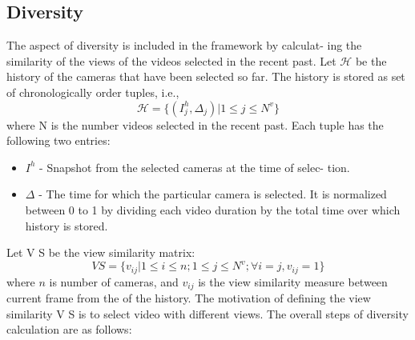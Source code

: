 \documentclass{sig-alternate-05-2015}
\begin{document}
\subsection{Diversity}
The aspect of diversity is included in the framework by calculat-
ing the similarity of the views of the videos selected in the recent
past. Let $\mathcal{H}$ be the history of the cameras that have been selected
so far. The history is stored as set of chronologically order tuples,
i.e.,
\begin{equation}
    \mathcal{H}=\{(I^h_j,\Delta_j)|1\leq j\leq N^v\}
\end{equation}
where N is the number videos selected in the recent past. Each
tuple has the following two entries:
\begin{itemize}
    \item $I^h$ - Snapshot from the selected cameras at the time of selec-
tion.
    \item $\Delta$ - The time for which the particular camera is selected. It
is normalized between 0 to 1 by dividing each video duration
by the total time over which history is stored.
\end{itemize}
Let V S be the view similarity matrix:
\begin{equation}
    VS = \{v_{ij}|1\leq i\leq n;1\leq j\leq N^v;\forall i=j,v_{ij}=1\}
\end{equation}
where $n$ is number of cameras, and $v_{ij}$ is the view similarity
measure between current frame from the %
of the history. The motivation of defining the view similarity V S is
to select video with different views. The overall steps of diversity
calculation are as follows:
\end{document}
